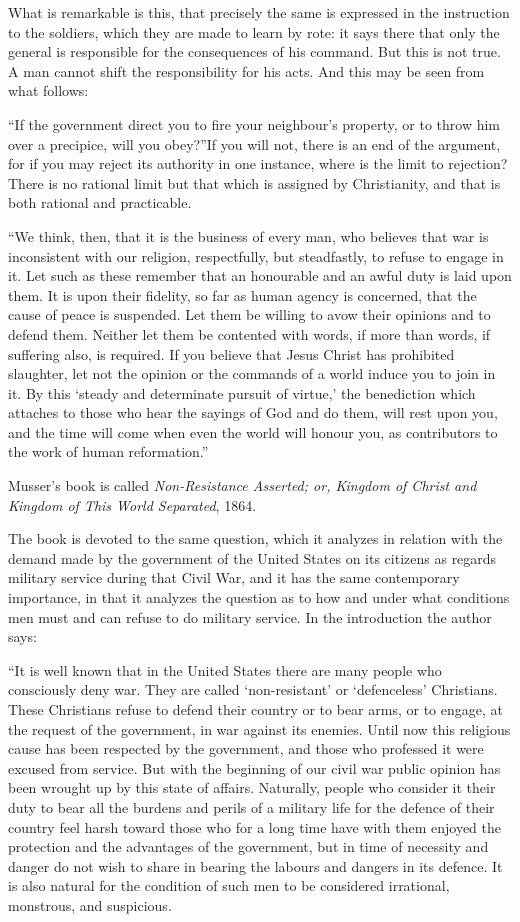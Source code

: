 \documentclass{book}
\begin{document}
What is remarkable is this, that precisely the same is expressed in the instruction to the soldiers, which they are made to learn by rote: it says there that only the general is responsible for the consequences of his command. But this is not true. A man cannot shift the responsibility for his acts. And this may be seen from what follows:

“If the government direct you to fire your neighbour’s property, or to throw him over a precipice, will you obey?”\footnotemark[3] If you will not, there is an end of the argument, for if you may reject its authority in one instance, where is the limit to rejection? There is no rational limit but that which is assigned by Christianity, and that is both rational and practicable.

“We think, then, that it is the business of every man, who believes that war is inconsistent with our religion, respectfully, but steadfastly, to refuse to engage in it. Let such as these remember that an honourable and an awful duty is laid upon them. It is upon their fidelity, so far as human agency is concerned, that the cause of peace is suspended. Let them be willing to avow their opinions and to defend them. Neither let them be contented with words, if more than words, if suffering also, is required. If you believe that Jesus Christ has prohibited slaughter, let not the opinion or the commands of a world induce you to join in it. By this ‘steady and determinate pursuit of virtue,’ the benediction which attaches to those who hear the sayings of God and do them, will rest upon you, and the time will come when even the world will honour you, as contributors to the work of human reformation.”

Musser’s book is called \emph{Non-Resistance Asserted; or, Kingdom of Christ and Kingdom of This World Separated}, 1864.\footnotemark[4]

The book is devoted to the same question, which it analyzes in relation with the demand made by the government of the United States on its citizens as regards military service during that Civil War, and it has the same contemporary importance, in that it analyzes the question as to how and under what conditions men must and can refuse to do military service. In the introduction the author says:

“It is well known that in the United States there are many people who consciously deny war. They are called ‘non-resistant’ or ‘defenceless’ Christians. These Christians refuse to defend their country or to bear arms, or to engage, at the request of the government, in war against its enemies. Until now this religious cause has been respected by the government, and those who professed it were excused from service. But with the beginning of our civil war public opinion has been wrought up by this state of affairs. Naturally, people who consider it their duty to bear all the burdens and perils of a military life for the defence of their country feel harsh toward those who for a long time have with them enjoyed the protection and the advantages of the government, but in time of necessity and danger do not wish to share in bearing the labours and dangers in its defence. It is also natural for the condition of such men to be considered irrational, monstrous, and suspicious.
\end{document}
